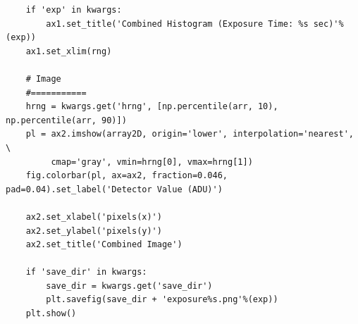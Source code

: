 \documentclass[preprint]{aastex62}
\begin{document}
\begin{lstlisting}
    if 'exp' in kwargs:
        ax1.set_title('Combined Histogram (Exposure Time: %s sec)'%(exp))
    ax1.set_xlim(rng)
    
    # Image
    #===========
    hrng = kwargs.get('hrng', [np.percentile(arr, 10), np.percentile(arr, 90)])
    pl = ax2.imshow(array2D, origin='lower', interpolation='nearest', \
         cmap='gray', vmin=hrng[0], vmax=hrng[1])
    fig.colorbar(pl, ax=ax2, fraction=0.046, pad=0.04).set_label('Detector Value (ADU)')
    
    ax2.set_xlabel('pixels(x)')
    ax2.set_ylabel('pixels(y)')
    ax2.set_title('Combined Image')
    
    if 'save_dir' in kwargs:
        save_dir = kwargs.get('save_dir')
        plt.savefig(save_dir + 'exposure%s.png'%(exp))
    plt.show()
\end{lstlisting}

% 

\end{document}
